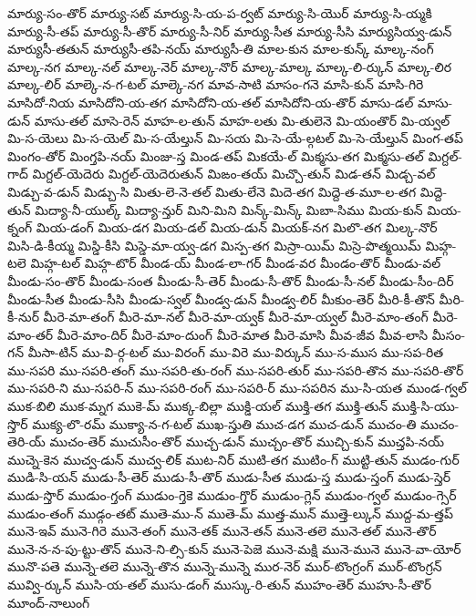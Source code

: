 {మార్యు-సం-తొర్
మార్యు-సట్
మార్యు-సి-య-ప-ర్వట్
మార్యు-సి-యొర్
మార్యు-సి-య్మకి
మార్యు-సీ-తప్
మార్యు-సీ-తొర్
మార్యు-సీ-నిర్
మార్యు-సీత
మార్యు-సీసి
మార్యుసియ్వ-డున్
మార్యుసీ-తతున్
మార్యుసీ-తపి-నయ్
మార్యుసీ-తి
మాల-కున
మాల-కున్క్
మాల్క-నంగ్
మాల్క-నగ
మాల్క-నల్
మాల్క-నెర్
మాల్క-నొర్
మాల్క-మాల్క
మాల్క-లి-ర్కున్
మాల్క-లిర
మాల్క-లిర్
మాల్కె-న-గ-టల్
మాల్కె-నగ
మావ-సాటి
మాసం-గనె
మాసి-కున్
మాసి-గిరె
మాసిదో-నియ
మాసిదోని-య-తగ
మాసిదోని-య-తల్
మాసిదోని-య-తొర్
మాసు-డల్
మాసు-డున్
మాసు-తల్
మాసె-రెన్
మాహ-ల-తున్
మాహ-లతు
మి-తులెనె
మి-యంతొర్
మి-య్వల్
మి-స-యెలు
మి-స-యెల్
మి-స-యేల్తున్
మి-సయ
మి-సె-యే-ల్గటల్
మి-సె-యేల్తున్
మింగ-తప్
మింగం-తోర్
మింగ్తపి-నయ్
మింజు-స్త
మిండ-తప్
మికయే-ల్
మిక్మసు-తగ
మిక్మసు-తల్
మిగ్దల్-గాద్
మిగ్దల్-యెదెరు
మిగ్దల్-యెదెరుతున్
మిఙం-తయ్
మిచ్చొ-తున్
మిడ-తన్
మిడ్చ-వల్
మిడ్చు-వ-డున్
మిడ్చు-సి
మితు-లె-నె-తల్
మితు-లేనె
మిదె-తగ
మిద్దె-త-మూ-ల-తగ
మిద్దె-తున్
మిద్యా-నీ-యుల్క్
మిద్యా-న్తుర్
మిని-మిని
మిన్క్-మిన్క్
మిబా-సిము
మియ-కున్
మియ-క్నంగ్
మియ-డంగ్
మియ-డగ
మియ-డల్
మియ-డున్
మియక్-నగ
మిలొ-తగ
మిల్క-నొర్
మిసి-డి-కీయ్మ
మిస్డి-కీసి
మిస్డె-మా-య్వ-డగ
మిస్ప-తగ
మిస్రా-యిమ్
మిస్రె-పొత్మయిమ్
మిహ్గ-టలె
మిహ్గ-టల్
మిహ్గ-టొర్
మీండ-య్
మీండ-లా-గర్
మీండ-వర
మీండం-తొర్
మీండు-వల్
మీండు-సం-తొర్
మీండు-సంత
మీండు-సీ-తెర్
మీండు-సీ-తొర్
మీండు-సీ-నల్
మీండు-సీం-దిర్
మీండు-సీత
మీండు-సీసి
మీండు-స్వల్
మీండ్వ-డున్
మీండ్వ-లిర్
మీకుం-తెర్
మీరి-కీ-తొన్
మీరి-కీ-నుర్
మీరె-మా-తంగ్
మీరె-మా-నల్
మీరె-మా-య్వక్
మీరె-మా-య్వల్
మీరె-మాం-తంగ్
మీరె-మాం-తర్
మీరె-మాం-దిర్
మీరె-మాం-దుంగ్
మీరె-మాత
మీరె-మాసి
మీవ-జీవ
మీవ-లాసి
మీసం-గన్
మీసా-టిన్
ము-వి-ర్గ-టల్
ము-విరంగ్
ము-విరె
ము-విర్కున్
ము-స-ముస
ము-సప-రిత
ము-సపరి
ము-సపరి-తంగ్
ము-సపరి-తు-రంగ్
ము-సపరి-తుర్
ము-సపరి-తొన
ము-సపరి-తొర్
ము-సపరి-ని
ము-సపరి-న్
ము-సపరి-రంగ్
ము-సపరి-ర్
ము-సపరిన
ము-సి-యత
ముండ-గ్వల్
ముక-బిలి
ముక-మ్నగ
ముకె-మ్
ముక్క-బిల్లా
ముక్డి-యల్
ముక్తి-తగ
ముక్తి-తున్
ముక్తి-సి-యు-స్తొర్
ముక్య-లొ-రమ్
ముక్యా-న-గ-టల్
ముఖ-స్తుతి
ముచ-డగ
ముచ-డున్
ముచం-తి
ముచం-తెరి-య్
ముచం-తెర్
ముచుసీం-తొర్
ముచ్చ-డున్
ముచ్చం-తొర్
ముచ్చి-కున్
ముచ్తపి-నయ్
ముచ్నె-కెన
ముచ్వ-డున్
ముచ్వ-లిక్
ముట-నిర్
ముటి-తగ
ముటిం-గ్
ముట్టి-తున్
ముడం-గుర్
ముడి-సి-యన్
ముడు-సీ-తెర్
ముడు-సీ-తొర్
ముడు-సీత
ముడు-స్త
ముడు-స్తంగ్
ముడు-స్తెర్
ముడు-స్తొర్
ముడుం-గ్తంగ్
ముడుం-గ్తెకె
ముడుం-గ్తొర్
ముడుం-గ్లెన్
ముడుం-గ్వల్
ముడుం-గ్సెర్
ముడుం-తంగ్
ముడ్గం-తట్
ముతె-ము-న్
ముతె-మ్
ముత్త-మున్
ముత్తె-ల్కున్
ముద్ద-మ-త్తప్
మునె-ఇవ్
మునె-గిరె
మునె-తంగ్
మునె-తక్
మునె-తన్
మునె-తలె
మునె-తల్
మునె-తొర్
మునె-న-న-పు-ట్టు-తొన్
మునె-ని-ల్సి-కున్
మునె-పెజె
మునె-మక్షి
మునె-మునె
మునె-వా-యోర్
మునొ-పతె
మున్నె-తలె
మున్నె-తొన
మున్నె-మున్నె
ముర-నెర్
ముర్-టొంగ్రంగ్
ముర్-టొంగ్రన్
మువ్వి-ర్కున్
ముసి-య-తల్
ముసు-డంగ్
ముస్కు-రి-తున్
ముహం-తెర్
ముహు-సీ-తొర్
మూంద్-నాలుంగ్
}
